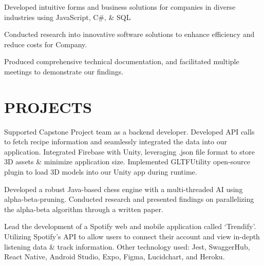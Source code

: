 \documentclass[]{deedy-resume-openfont}
\begin{document}
\begin{tightemize}
\item Developed intuitive forms and business solutions for companies in diverse industries using JavaScript, C\#, \& SQL 
\item Conducted research into innovative software solutions to enhance efficiency and reduce costs for Company. 
\item Produced comprehensive technical documentation, and facilitated multiple meetings to demonstrate our findings.
\end{tightemize}


\section{PROJECTS}
\begin{tightemize}
\item Supported Capstone Project team as a backend developer. Developed API calls to fetch recipe information and seamlessly integrated the data into our application. Integrated Firebase with Unity, leveraging .json file format to store  3D assets \& minimize application size. Implemented  GLTFUtility open-source plugin to load 3D models into our Unity app during runtime.
\end{tightemize}
\sectionsep

\begin{tightemize}
\item Developed a robust Java-based chess engine with a multi-threaded AI using alpha-beta-pruning. 
Conducted research and presented findings on parallelizing the alpha-beta algorithm through a written paper.
\end{tightemize}
\sectionsep

\begin{tightemize}
\item Lead the development of a Spotify web and mobile application called ‘Trendify’. Utilizing Spotify’s API to allow users to connect their account and view in-depth listening data \& track information. Other technology used: Jest, SwaggerHub, React Native, Android Studio, Expo, Figma, Lucidchart, and Heroku.
\end{tightemize}
\end{document}

